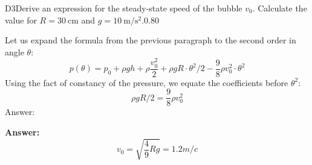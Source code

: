 \documentclass[11pt,a4paper]{article}
\begin{document}
\begin{solcard}{D3}{Derive an expression for the steady-state speed of the bubble $v_0$. Calculate the value for $R = 30~\text{cm}$ and $g = 10~\text{m}/\text{s}^2$.}{0.80}

Let us expand the formula from the previous paragraph to the second order in angle $\theta$: $$p(\theta) = p_0 +\rho g h + \rho \frac{v_0^2}{2} + \rho g R \cdot \theta^2 /2 -  \frac{9}{8}\rho v_0^2 \cdot \theta^2$$Using the fact of constancy of the pressure, we equate the coefficients before $\theta^2$: $$  \rho g R  / 2= \frac{9}{8}\rho v_0^2 $$Answer:

\par\smallskip\noindent\textbf{Answer:} $$v_0 = \sqrt{\dfrac{4}{9}Rg}=1.2 m/c$$
\end{solcard}
\end{document}
